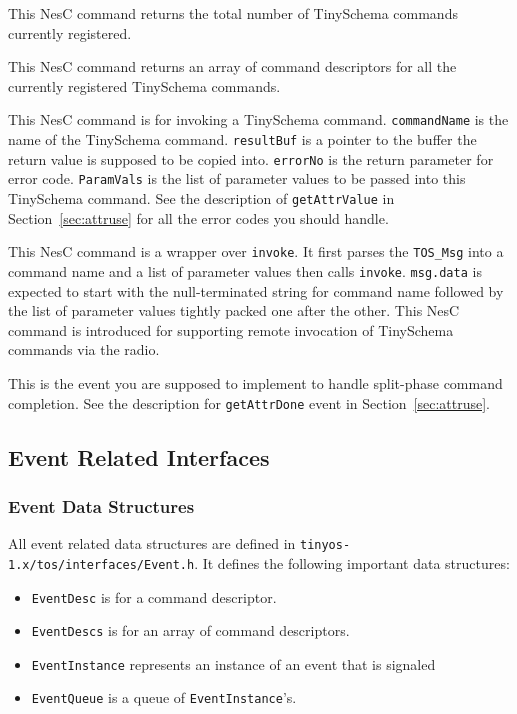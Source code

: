 \documentclass[11pt]{article}
\newcommand{\docroot}{tinyos-1.x}
\begin{document}
This NesC command returns the total number of TinySchema commands
currently registered.



This NesC command returns an array of command descriptors for all
the currently registered TinySchema commands.



This NesC command is for invoking a TinySchema command.  {\tt commandName} is
the name of the TinySchema command.  {\tt resultBuf} is a pointer to
the buffer the return value is supposed to be copied into.  {\tt errorNo} is
the return parameter for error code.  {\tt ParamVals} is the
list of parameter values to be passed into this TinySchema command.
See the description of {\tt getAttrValue} in Section~\ref{sec:attruse}
for all the error codes you should handle.



This NesC command is a wrapper over {\tt invoke}.  It first parses the
{\tt TOS\_Msg} into a command name and a list of parameter values then calls
{\tt invoke}.  {\tt msg.data} is expected to start with the null-terminated
string for command name followed by the list of parameter values tightly
packed one after the other.  This NesC command is introduced for
supporting remote invocation of TinySchema commands via the radio.



This is the event you are supposed to implement to handle split-phase
command completion.  See the description for {\tt getAttrDone} event
in Section~\ref{sec:attruse}.

\subsection{Event Related Interfaces}
\subsubsection{Event Data Structures}

All event related data structures are defined in
{\tt \docroot/tos/interfaces/Event.h}.
It defines the following important data structures:
\begin{itemize}
\item {\tt EventDesc} is for a command descriptor.
\item {\tt EventDescs} is for an array of command descriptors.
\item {\tt EventInstance} represents an instance of an event that is signaled
\item {\tt EventQueue} is a queue of {\tt EventInstance}'s.
\end{itemize}
\end{document}
